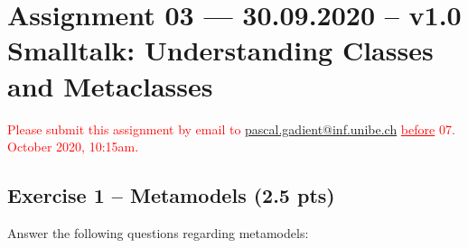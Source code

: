 \documentclass [11pt, a4wide, twoside]{article}
\begin{document}
\section*{Assignment 03  --- 30.09.2020 -- v1.0\\Smalltalk: Understanding Classes and Metaclasses}

\textcolor{red}{Please submit this assignment by email to \href{mailto:pascal.gadient@inf.unibe.ch}{pascal.gadient@inf.unibe.ch} \underline{before} 07. October 2020, 10:15am.}

\subsection*{Exercise 1 -- Metamodels (2.5 pts)}
Answer the following questions regarding metamodels:
\end{document}
